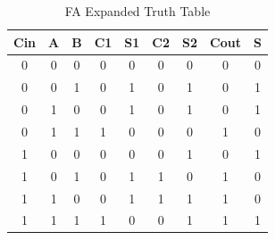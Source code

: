 \documentclass[11pt]{article}
\begin{document}
	\begin{table}[ht]\centering
		\caption{FA Expanded Truth Table}
		\label{tbl:example_table}
		\begin{tabular}{ccc|cccc|cc}
			\toprule
			Cin & A & B & C1 & S1 & C2 & S2 & Cout & S \\
			\midrule
			0 & 0 & 0 & 0 & 0 & 0 & 0 & 0 & 0 \\
			0 & 0 & 1 & 0 & 1 & 0 & 1 & 0 & 1 \\
			0 & 1 & 0 & 0 & 1 & 0 & 1 & 0 & 1 \\
			0 & 1 & 1 & 1 & 0 & 0 & 0 & 1 & 0 \\
			1 & 0 & 0 & 0 & 0 & 0 & 1 & 0 & 1 \\
			1 & 0 & 1 & 0 & 1 & 1 & 0 & 1 & 0 \\
			1 & 1 & 0 & 0 & 1 & 1 & 1 & 1 & 0 \\
			1 & 1 & 1 & 1 & 0 & 0 & 1 & 1 & 1 \\
			\bottomrule
		\end{tabular} 
	\end{table}
\end{document}
